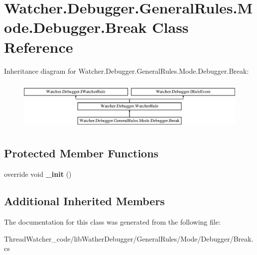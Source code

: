 \hypertarget{class_watcher_1_1_debugger_1_1_general_rules_1_1_mode_1_1_debugger_1_1_break}{\section{Watcher.\+Debugger.\+General\+Rules.\+Mode.\+Debugger.\+Break Class Reference}
\label{class_watcher_1_1_debugger_1_1_general_rules_1_1_mode_1_1_debugger_1_1_break}
}
Inheritance diagram for Watcher.\+Debugger.\+General\+Rules.\+Mode.\+Debugger.\+Break\+:\begin{figure}[H]
\begin{center}
\leavevmode
\includegraphics[height=2.470588cm]{class_watcher_1_1_debugger_1_1_general_rules_1_1_mode_1_1_debugger_1_1_break}
\end{center}
\end{figure}
\subsection*{Protected Member Functions}
\begin{DoxyCompactItemize}
\item 
\hypertarget{class_watcher_1_1_debugger_1_1_general_rules_1_1_mode_1_1_debugger_1_1_break_a9bf9ec8f420cb3f0523450a6149784bd}{override void {\bfseries \+\_\+init} ()}\label{class_watcher_1_1_debugger_1_1_general_rules_1_1_mode_1_1_debugger_1_1_break_a9bf9ec8f420cb3f0523450a6149784bd}

\end{DoxyCompactItemize}
\subsection*{Additional Inherited Members}


The documentation for this class was generated from the following file\+:\begin{DoxyCompactItemize}
\item 
Thread\+Watcher\+\_\+code/lib\+Wather\+Debugger/\+General\+Rules/\+Mode/\+Debugger/Break.\+cs\end{DoxyCompactItemize}
